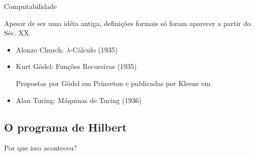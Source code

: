 \documentclass{beamer}
\begin{document}
\begin{frame}{Computabilidade}

\begin{block}{}

Apesar de ser uma idéia antiga, definições formais só foram aparecer a partir do Séc. XX.

\begin{itemize}
\item Alonzo Church: $\lambda$-Cálculo (1935)

\cite{church1936unsolvable}

\item Kurt Gödel: Funções Recursivas (1935)

Propostas por Gödel em Princeton e publicadas por Kleene em \cite{kleene1936general}

\item Alan Turing: Máquinas de Turing  (1936)

\cite{turing1937computable}

\end{itemize}

\end{block}

\end{frame}


\subsection{O programa de Hilbert}

\begin{frame}{Por que isso aconteceu?}

\begin{figure}
    \centering
    \qquad
\end{figure}

\end{frame}
\end{document}
